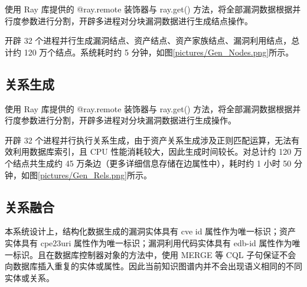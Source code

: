 \documentclass[a4paper,AutoFakeBold,oneside,12pt]{book}
\begin{document}
使用 Ray 库提供的 @ray.remote 装饰器与 ray.get() 方法，将全部漏洞数据根据并行度参数进行分割，开辟多进程对分块漏洞数据进行生成结点操作。

开辟 32 个进程并行生成漏洞结点、资产结点、资产家族结点、漏洞利用结点，总计约 120 万个结点。系统耗时约 5 分钟，如图\ref{pictures/Gen_Nodes.png}所示。



\subsection{关系生成}

使用 Ray 库提供的 @ray.remote 装饰器与 ray.get() 方法，将全部漏洞数据根据并行度参数进行分割，开辟多进程对分块漏洞数据进行生成操作。

开辟 32 个进程并行执行关系生成，由于资产关系生成涉及正则匹配运算，无法有效利用数据库索引，且 CPU 性能消耗较大，因此生成时间较长。对总计约 120 万个结点共生成约 45 万条边（更多详细信息存储在边属性中），耗时约 1 小时 50 分钟，如图\ref{pictures/Gen_Rels.png}所示。



\subsection{关系融合}

本系统设计上，结构化数据生成的漏洞实体具有 cve id 属性作为唯一标识；资产实体具有 cpe23uri 属性作为唯一标识；漏洞利用代码实体具有 edb-id 属性作为唯一标识。且在数据库控制器对象的方法中，使用 MERGE 等 CQL 子句保证不会向数据库插入重复的实体或属性。因此当前知识图谱内并不会出现语义相同的不同实体或关系。
\end{document}
